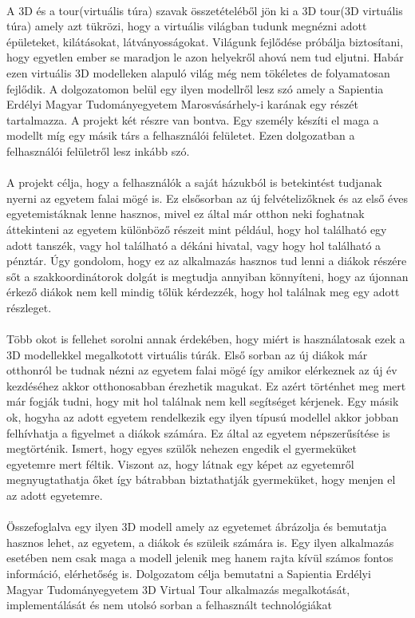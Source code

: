 \paragraph{}
A 3D és a tour(virtuális túra) szavak összetételéből jön ki a 3D tour(3D virtuális túra) amely azt tükrözi, hogy a virtuális világban tudunk megnézni adott épületeket, kilátásokat, látványosságokat. Világunk fejlődése próbálja biztosítani, hogy egyetlen ember se maradjon le azon helyekről ahová nem tud eljutni. Habár ezen virtuális 3D modelleken alapuló világ még nem tökéletes de folyamatosan fejlődik. A dolgozatomon belül egy ilyen modellről lesz szó amely a Sapientia Erdélyi Magyar Tudományegyetem Marosvásárhely-i karának egy részét tartalmazza. A projekt két részre van bontva. Egy személy készíti el maga a modellt míg egy másik társ a felhasználói felületet. Ezen dolgozatban a felhasználói felületről lesz inkább szó. 
\paragraph{}
A projekt célja, hogy a felhasználók a saját házukból is betekintést tudjanak nyerni az egyetem falai mögé is. Ez elsősorban az új felvételizőknek és az első éves egyetemistáknak lenne hasznos, mivel ez által már otthon neki foghatnak áttekinteni az egyetem különböző részeit mint például, hogy hol található egy adott tanszék, vagy hol található a dékáni hivatal, vagy hogy hol található a pénztár. Úgy gondolom, hogy ez az alkalmazás hasznos tud lenni a diákok részére sőt a szakkoordinátorok dolgát is megtudja annyiban könnyíteni, hogy az újonnan érkező diákok nem kell mindig tőlük kérdezzék, hogy hol találnak meg egy adott részleget.
\paragraph{}
Több okot is fellehet sorolni annak érdekében, hogy miért is használatosak ezek a 3D modellekkel megalkotott virtuális túrák. Első sorban az új diákok már otthonról be tudnak nézni az egyetem falai mögé így amikor elérkeznek az új év kezdéséhez akkor otthonosabban érezhetik magukat. Ez azért történhet meg mert már fogják tudni, hogy mit hol találnak nem kell segítséget kérjenek. Egy másik ok, hogyha az adott egyetem rendelkezik egy ilyen típusú modellel akkor jobban felhívhatja a figyelmet a diákok számára. Ez által az egyetem népszerűsítése is megtörténik. Ismert, hogy egyes szülők nehezen engedik el gyermeküket egyetemre mert féltik. Viszont az, hogy látnak egy  képet az egyetemről megnyugtathatja őket így bátrabban biztathatják gyermeküket, hogy menjen el az adott egyetemre. 
\paragraph{}
Összefoglalva egy ilyen 3D modell amely az egyetemet ábrázolja és bemutatja hasznos lehet, az egyetem, a diákok és szüleik számára is. Egy ilyen alkalmazás esetében nem csak maga a modell jelenik meg hanem rajta kívül számos fontos információ, elérhetőség is. Dolgozatom célja bemutatni a Sapientia Erdélyi Magyar Tudományegyetem 3D Virtual Tour alkalmazás megalkotását, implementálását és nem utolsó sorban a felhasznált technológiákat

